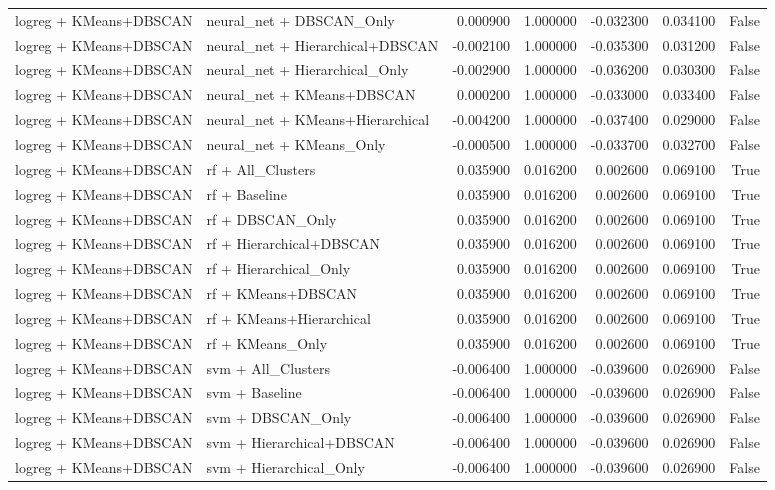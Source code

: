\begin{tabular}{llrrrrr}
logreg + KMeans+DBSCAN & neural_net + DBSCAN_Only & 0.000900 & 1.000000 & -0.032300 & 0.034100 & False \\
logreg + KMeans+DBSCAN & neural_net + Hierarchical+DBSCAN & -0.002100 & 1.000000 & -0.035300 & 0.031200 & False \\
logreg + KMeans+DBSCAN & neural_net + Hierarchical_Only & -0.002900 & 1.000000 & -0.036200 & 0.030300 & False \\
logreg + KMeans+DBSCAN & neural_net + KMeans+DBSCAN & 0.000200 & 1.000000 & -0.033000 & 0.033400 & False \\
logreg + KMeans+DBSCAN & neural_net + KMeans+Hierarchical & -0.004200 & 1.000000 & -0.037400 & 0.029000 & False \\
logreg + KMeans+DBSCAN & neural_net + KMeans_Only & -0.000500 & 1.000000 & -0.033700 & 0.032700 & False \\
logreg + KMeans+DBSCAN & rf + All_Clusters & 0.035900 & 0.016200 & 0.002600 & 0.069100 & True \\
logreg + KMeans+DBSCAN & rf + Baseline & 0.035900 & 0.016200 & 0.002600 & 0.069100 & True \\
logreg + KMeans+DBSCAN & rf + DBSCAN_Only & 0.035900 & 0.016200 & 0.002600 & 0.069100 & True \\
logreg + KMeans+DBSCAN & rf + Hierarchical+DBSCAN & 0.035900 & 0.016200 & 0.002600 & 0.069100 & True \\
logreg + KMeans+DBSCAN & rf + Hierarchical_Only & 0.035900 & 0.016200 & 0.002600 & 0.069100 & True \\
logreg + KMeans+DBSCAN & rf + KMeans+DBSCAN & 0.035900 & 0.016200 & 0.002600 & 0.069100 & True \\
logreg + KMeans+DBSCAN & rf + KMeans+Hierarchical & 0.035900 & 0.016200 & 0.002600 & 0.069100 & True \\
logreg + KMeans+DBSCAN & rf + KMeans_Only & 0.035900 & 0.016200 & 0.002600 & 0.069100 & True \\
logreg + KMeans+DBSCAN & svm + All_Clusters & -0.006400 & 1.000000 & -0.039600 & 0.026900 & False \\
logreg + KMeans+DBSCAN & svm + Baseline & -0.006400 & 1.000000 & -0.039600 & 0.026900 & False \\
logreg + KMeans+DBSCAN & svm + DBSCAN_Only & -0.006400 & 1.000000 & -0.039600 & 0.026900 & False \\
logreg + KMeans+DBSCAN & svm + Hierarchical+DBSCAN & -0.006400 & 1.000000 & -0.039600 & 0.026900 & False \\
logreg + KMeans+DBSCAN & svm + Hierarchical_Only & -0.006400 & 1.000000 & -0.039600 & 0.026900 & False \\

\end{tabular}
